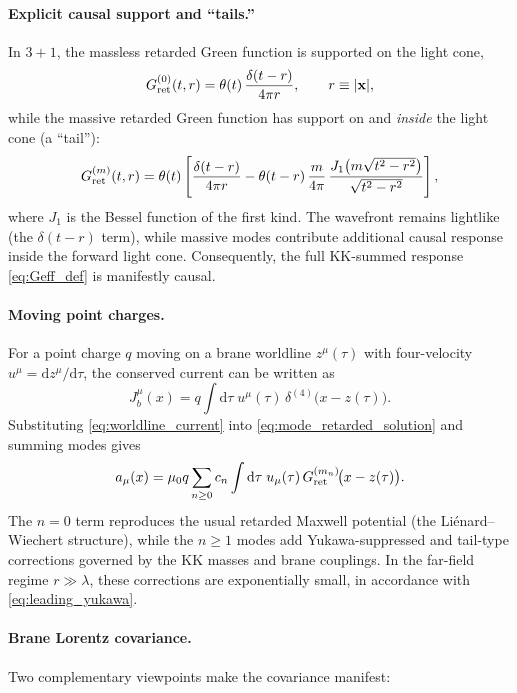 \documentclass[11pt]{article}
\newcommand{\dd}{\mathrm d}
\newcommand{\J}{J}
\newcommand{\lam}{\lambda}      %
\newcommand{\muo}{\mu_0}
\begin{document}
\paragraph{Explicit causal support and ``tails.''}
In \(3+1\), the massless retarded Green function is supported on the light cone,
\begin{equation}
  G^{(0)}_{\rm ret}(t,r)
  = \theta(t)\,\frac{\delta(t-r)}{4\pi r},
  \qquad r\equiv|\mathbf{x}|,
\end{equation}
while the massive retarded Green function has support on and \emph{inside} the
light cone (a ``tail''):
\begin{equation}
  G^{(m)}_{\rm ret}(t,r)
  = \theta(t)\left[
      \frac{\delta(t-r)}{4\pi r}
      - \theta(t-r)\,\frac{m}{4\pi}\,
        \frac{J_1\!\left(m\sqrt{t^2-r^2}\right)}{\sqrt{t^2-r^2}}
    \right],
  \label{eq:KG_retarded}
\end{equation}
where \(J_1\) is the Bessel function of the first kind. The wavefront remains
lightlike (the \(\delta(t-r)\) term), while massive modes contribute additional
causal response inside the forward light cone. Consequently, the full KK-summed
response \cref{eq:Geff_def} is manifestly causal.

\paragraph{Moving point charges.}
For a point charge \(q\) moving on a brane worldline \(z^\mu(\tau)\) with
four-velocity \(u^\mu=\dd z^\mu/\dd\tau\), the conserved current can be written as
\begin{equation}
  \J_b^\mu(x) = q\int \dd\tau\;u^\mu(\tau)\,\delta^{(4)}\!\big(x-z(\tau)\big).
  \label{eq:worldline_current}
\end{equation}
Substituting \cref{eq:worldline_current} into \cref{eq:mode_retarded_solution} and
summing modes gives
\begin{equation}
  a_\mu(x)
  = \muo q \sum_{n\ge 0} c_n \int \dd\tau\;
    u_\mu(\tau)\,G^{(m_n)}_{\rm ret}\!\big(x-z(\tau)\big).
  \label{eq:worldline_potential}
\end{equation}
The \(n=0\) term reproduces the usual retarded Maxwell potential (the
Liénard--Wiechert structure), while the \(n\ge 1\) modes add Yukawa-suppressed and
tail-type corrections governed by the KK masses and brane couplings. In the
far-field regime \(r\gg \lam\), these corrections are exponentially small, in
accordance with \cref{eq:leading_yukawa}.

\paragraph{Brane Lorentz covariance.}
Two complementary viewpoints make the covariance manifest:
\end{document}
